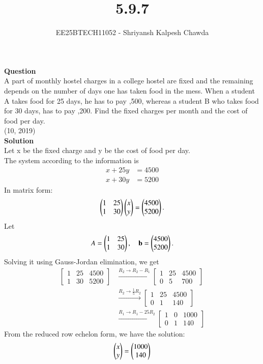 \documentclass[article]{IEEEtran}
\begin{document}
	\title{5.9.7}
	\author{EE25BTECH11052 - Shriyansh Kalpesh Chawda}
	\maketitle
\textbf{Question}\\
	A part of monthly hostel charges in a college hostel are fixed and the remaining depends on the number of days one has taken food in the mess. When a student A takes food for 25 days, he has to pay ,500, whereas a student B who takes food for 30 days, has to pay ,200. Find the fixed charges per month and the cost of
	food per day.\\

	\hfill{(10, 2019)}\\
	\textbf{Solution}\\
Let x be the fixed charge and y be the cost of food per day.\\
The system according to the information is
\begin{align}
	x + 25y &= 4500 \\
	x + 30y &= 5200
\end{align}
In matrix form:
\begin{align}
	\begin{pmatrix}1 & 25 \\ 1 & 30\end{pmatrix} \begin{pmatrix}x \\ y\end{pmatrix} = \begin{pmatrix}4500 \\ 5200\end{pmatrix}.
\end{align}
Let
\begin{align}
	A = \begin{pmatrix}1 & 25 \\ 1 & 30\end{pmatrix}, \quad \mathbf{b} = \begin{pmatrix}4500 \\ 5200\end{pmatrix}.
\end{align}
Solving it using Gauss-Jordan elimination, we get
\begin{align}
	\left[\begin{array}{cc|c}
		1 & 25 & 4500 \\
		1 & 30 & 5200
	\end{array}\right]
	&\xrightarrow{R_2 \rightarrow R_2 - R_1}
	\left[\begin{array}{cc|c}
		1 & 25 & 4500 \\
		0 & 5 & 700
	\end{array}\right] \\
	&\xrightarrow{R_2 \rightarrow \tfrac{1}{5}R_2}
	\left[\begin{array}{cc|c}
		1 & 25 & 4500 \\
		0 & 1 & 140
	\end{array}\right] \\
	&\xrightarrow{R_1 \rightarrow R_1 - 25R_2}
	\left[\begin{array}{cc|c}
		1 & 0 & 1000 \\
		0 & 1 & 140
	\end{array}\right]
\end{align}
From the reduced row echelon form, we have the solution:
\begin{align}
	\begin{pmatrix}x \\ y\end{pmatrix} = \begin{pmatrix}1000 \\ 140\end{pmatrix}
\end{align}
\end{document}
